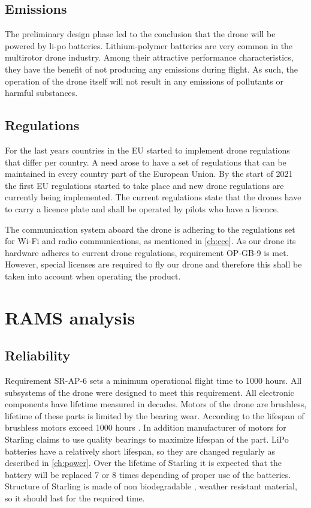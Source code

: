 \subsection{Emissions}
The preliminary design phase led to the conclusion that the drone will be powered by li-po batteries. Lithium-polymer batteries are very common in the multirotor drone industry. Among their attractive performance characteristics, they have the benefit of not producing any emissions during flight. As such, the operation of the drone itself will not result in any emissions of pollutants or harmful substances.

\subsection{Regulations}
 For the last years countries in the EU started to implement drone regulations that differ per country. A need arose to have a set of regulations that can be maintained in every country part of the European Union. By the start of 2021 the first EU regulations started to take place and new drone regulations are currently being implemented. The current regulations state that the drones have to carry a licence plate and shall be operated by pilots who have a licence.
 
 The communication system aboard the drone is adhering to the regulations set for Wi-Fi and radio communications, as mentioned in \autoref{ch:cce}. As our drone its hardware adheres to current drone regulations, requirement OP-GB-9 is met. However, special licenses are required to fly our drone and therefore this shall be taken into account when operating the product.



\section{RAMS analysis} \label{sec:RAMS}

\subsection{Reliability} %
Requirement SR-AP-6 sets a minimum operational flight time to 1000 hours. All subsystems of the drone were designed to meet this requirement. All electronic components have lifetime measured in decades. Motors of the drone are brushless, lifetime of these parts is limited by the bearing wear. According to  \cite{brushless_motor_life} the lifespan of brushless motors exceed 1000 hours . In addition manufacturer of motors for Starling claims to use quality bearings to maximize lifespan of the part. LiPo batteries have a relatively short lifespan, so they are changed regularly as described in \autoref{ch:power}. Over the lifetime of Starling it is expected that the battery will be replaced 7  or 8 times depending of proper use of the batteries. Structure of Starling is made of non biodegradable , weather resistant material, so it should last for the required time. 



